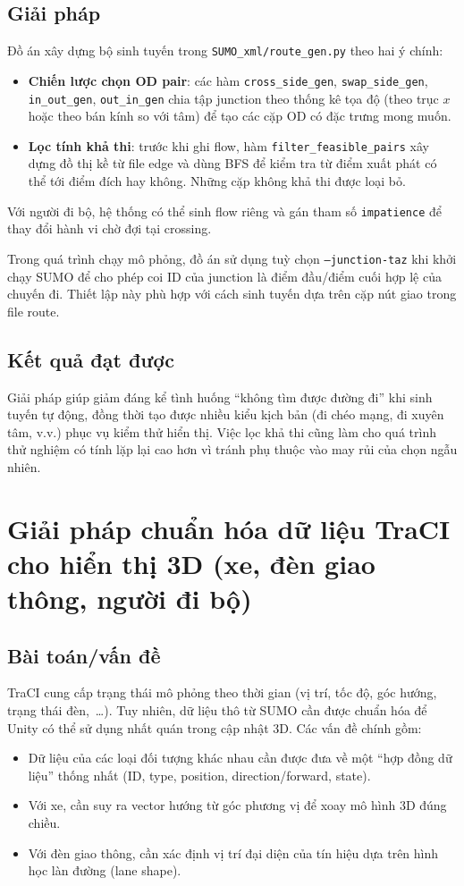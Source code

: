 \documentclass[../DoAn.tex]{subfiles}
\begin{document}
\subsection{Giải pháp}
Đồ án xây dựng bộ sinh tuyến trong \texttt{SUMO\_xml/route\_gen.py} theo hai ý chính:
\begin{itemize}[leftmargin=2em]
	\item \textbf{Chiến lược chọn OD pair}: các hàm \texttt{cross\_side\_gen}, \texttt{swap\_side\_gen}, \texttt{in\_out\_gen}, \texttt{out\_in\_gen} chia tập junction theo thống kê tọa độ (theo trục $x$ hoặc theo bán kính so với tâm) để tạo các cặp OD có đặc trưng mong muốn.
	\item \textbf{Lọc tính khả thi}: trước khi ghi flow, hàm \texttt{filter\_feasible\_pairs} xây dựng đồ thị kề từ file edge và dùng BFS để kiểm tra từ điểm xuất phát có thể tới điểm đích hay không. Những cặp không khả thi được loại bỏ.
\end{itemize}
Với người đi bộ, hệ thống có thể sinh flow riêng và gán tham số \texttt{impatience} để thay đổi hành vi chờ đợi tại crossing.

Trong quá trình chạy mô phỏng, đồ án sử dụng tuỳ chọn \texttt{--junction-taz} khi khởi chạy SUMO để cho phép coi ID của junction là điểm đầu/điểm cuối hợp lệ của chuyến đi. Thiết lập này phù hợp với cách sinh tuyến dựa trên cặp nút giao trong file route.

\subsection{Kết quả đạt được}
Giải pháp giúp giảm đáng kể tình huống ``không tìm được đường đi'' khi sinh tuyến tự động, đồng thời tạo được nhiều kiểu kịch bản (đi chéo mạng, đi xuyên tâm, v.v.) phục vụ kiểm thử hiển thị. Việc lọc khả thi cũng làm cho quá trình thử nghiệm có tính lặp lại cao hơn vì tránh phụ thuộc vào may rủi của chọn ngẫu nhiên.

\section{Giải pháp chuẩn hóa dữ liệu TraCI cho hiển thị 3D (xe, đèn giao thông, người đi bộ)}
\subsection{Bài toán/vấn đề}
TraCI cung cấp trạng thái mô phỏng theo thời gian (vị trí, tốc độ, góc hướng, trạng thái đèn, \,\ldots). Tuy nhiên, dữ liệu thô từ SUMO cần được chuẩn hóa để Unity có thể sử dụng nhất quán trong cập nhật 3D. Các vấn đề chính gồm:
\begin{itemize}[leftmargin=2em]
	\item Dữ liệu của các loại đối tượng khác nhau cần được đưa về một ``hợp đồng dữ liệu'' thống nhất (ID, type, position, direction/forward, state).
	\item Với xe, cần suy ra vector hướng từ góc phương vị để xoay mô hình 3D đúng chiều.
	\item Với đèn giao thông, cần xác định vị trí đại diện của tín hiệu dựa trên hình học làn đường (lane shape).
\end{itemize}
\end{document}
